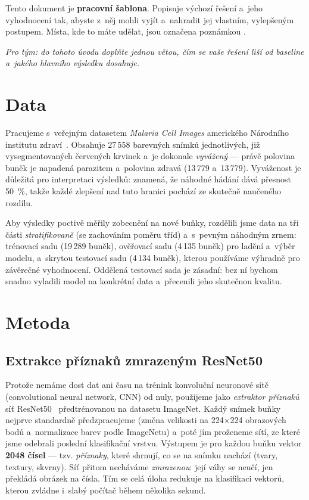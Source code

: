 \documentclass[11pt]{article}
\newcommand{\Ntotal}{27\,558}
\newcommand{\Ntrain}{19\,289}
\newcommand{\Nval}{4\,135}
\newcommand{\Ntest}{4\,134}
\begin{document}
Tento dokument je \textbf{pracovní šablona}. Popisuje výchozí řešení a~jeho vyhodnocení tak,
abyste z~něj mohli vyjít a~nahradit jej vlastním, vylepšeným postupem. Místa, kde to máte
udělat, jsou označena poznámkou .

\medskip\noindent\textit{Pro tým: do tohoto úvodu doplňte jednou větou, čím se vaše řešení
liší od baseline a~jakého hlavního výsledku dosahuje.}

\section{Data}
\label{sec:data}

Pracujeme s~veřejným datasetem \emph{Malaria Cell Images} amerického Národního institutu
zdraví~\cite{rajaraman2018}. Obsahuje \Ntotal{} barevných snímků jednotlivých, již
vysegmentovaných červených krvinek a~je dokonale \emph{vyvážený} --- právě polovina buněk
je napadená parazitem a~polovina zdravá (13\,779 a~13\,779). Vyváženost je důležitá pro
interpretaci výsledků: znamená, že náhodné hádání dává přesnost 50~\%, takže každé zlepšení
nad tuto hranici pochází ze skutečně naučeného rozdílu.

Aby výsledky poctivě měřily zobecnění na nové buňky, rozdělili jsme data na tři části
\emph{stratifikovaně} (se zachováním poměru tříd) a~s~pevným náhodným zrnem: trénovací
sadu (\Ntrain{} buněk), ověřovací sadu (\Nval{} buněk) pro ladění a~výběr modelu, a~skrytou
testovací sadu (\Ntest{} buněk), kterou používáme výhradně pro závěrečné vyhodnocení.
Oddělená testovací sada je zásadní: bez ní bychom snadno vyladili model na konkrétní data
a~přecenili jeho skutečnou kvalitu.

\section{Metoda}
\label{sec:metoda}

\subsection{Extrakce příznaků zmrazeným ResNet50}
\label{sec:priznaky}

Protože nemáme dost dat ani času na trénink konvoluční neuronové sítě (convolutional neural
network, CNN) od nuly, použijeme jako \emph{extraktor příznaků} síť ResNet50~\cite{he2016}
předtrénovanou na datasetu ImageNet. Každý snímek buňky nejprve standardně předzpracujeme
(změna velikosti na 224$\times$224 obrazových bodů a~normalizace barev podle ImageNetu)
a~poté jím proženeme sítí, ze které jsme odebrali poslední klasifikační vrstvu. Výstupem je
pro každou buňku vektor \textbf{2048 čísel} --- tzv. \emph{příznaky}, které shrnují, co se
na snímku nachází (tvary, textury, skvrny). Síť přitom necháváme \emph{zmrazenou}: její váhy
se neučí, jen překládá obrázek na čísla. Tím se celá úloha redukuje na klasifikaci vektorů,
kterou zvládne i~slabý počítač během několika sekund.
\end{document}
